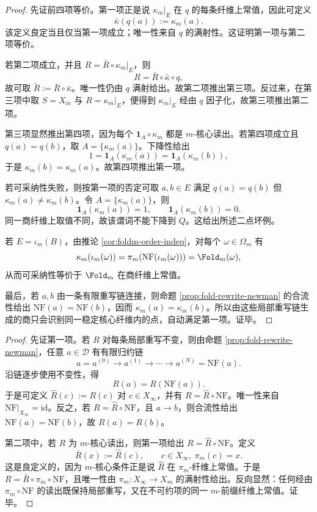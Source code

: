 \begin{proof}
先证前四项等价。第一项正是说 \(\kappa_m|_E\) 在 \(q\) 的每条纤维上常值，因此可定义
\[
\bar\kappa(q(a)):=\kappa_m(a).
\]
该定义良定当且仅当第一项成立；唯一性来自 \(q\) 的满射性。这证明第一项与第二项等价。

若第二项成立，并且 \(R=\bar R\circ\kappa_m|_E\)，则
\[
R=\bar R\circ\bar\kappa\circ q,
\]
故可取 \(\widetilde R:=\bar R\circ\bar\kappa\)。唯一性仍由 \(q\) 满射给出。故第二项推出第三项。反过来，在第三项中取 \(S=X_m\) 与 \(R=\kappa_m|_E\)，便得到 \(\kappa_m|_E\) 经由 \(q\) 因子化，故第三项推出第二项。

第三项显然推出第四项，因为每个 \(\mathbf 1_A\circ\kappa_m\) 都是 \(m\)-核心读出。若第四项成立且 \(q(a)=q(b)\)，取
\(A=\{\kappa_m(a)\}\)。下降性给出
\[
1=\mathbf 1_A(\kappa_m(a))=\mathbf 1_A(\kappa_m(b)),
\]
于是 \(\kappa_m(b)=\kappa_m(a)\)。故第四项推出第一项。

若可采纳性失败，则按第一项的否定可取 \(a,b\in E\) 满足
\(q(a)=q(b)\) 但 \(\kappa_m(a)\ne\kappa_m(b)\)。令
\(A=\{\kappa_m(a)\}\)，则
\[
\mathbf 1_A(\kappa_m(a))=1,
\qquad
\mathbf 1_A(\kappa_m(b))=0.
\]
同一商纤维上取值不同，故该谓词不能下降到 \(Q\)。这给出所述二点坏例。

若 \(E=\iota_m(B)\)，由推论 \ref{cor:foldm-order-indep}，对每个 \(\omega\in\Omega_m\) 有
\[
\kappa_m(\iota_m(\omega))
=\pi_m(\mathrm{NF}(\iota_m(\omega)))
=\Fold_m(\omega),
\]
从而可采纳性等价于 \(\Fold_m\) 在商纤维上常值。

最后，若 \(a,b\) 由一条有限重写链连接，则命题 \ref{prop:fold-rewrite-newman} 的合流性给出
\(\mathrm{NF}(a)=\mathrm{NF}(b)\)，因而
\(\kappa_m(a)=\kappa_m(b)\)。所以由这些局部重写链生成的商只会识别同一稳定核心纤维内的点，自动满足第一项。证毕。
\end{proof}

\begin{proof}
先证第一项。若 \(R\) 对每条局部重写不变，则由命题 \ref{prop:fold-rewrite-newman}，任意 \(a\in\mathcal D\) 有有限归约链
\[
a=a^{(0)}\to a^{(1)}\to\cdots\to a^{(N)}=\mathrm{NF}(a).
\]
沿链逐步使用不变性，得
\[
R(a)=R(\mathrm{NF}(a)).
\]
于是可定义 \(\widehat R(c):=R(c)\) 对 \(c\in X_\infty\)，并有 \(R=\widehat R\circ\mathrm{NF}\)。唯一性来自 \(\mathrm{NF}|_{X_\infty}=\mathrm{id}\)。反之，若 \(R=\widehat R\circ\mathrm{NF}\)，且 \(a\to b\)，则合流性给出 \(\mathrm{NF}(a)=\mathrm{NF}(b)\)，故 \(R(a)=R(b)\)。

第二项中，若 \(R\) 为 \(m\)-核心读出，则第一项给出 \(R=\widehat R\circ\mathrm{NF}\)。定义
\[
\bar R(x):=\widehat R(c),\qquad c\in X_\infty,\ \pi_m(c)=x.
\]
这是良定义的，因为 \(m\)-核心条件正是说 \(\widehat R\) 在 \(\pi_m\)-纤维上常值。于是 \(R=\bar R\circ\pi_m\circ\mathrm{NF}\)，且唯一性由 \(\pi_m:X_\infty\to X_m\) 的满射性给出。反向显然：任何经由 \(\pi_m\circ\mathrm{NF}\) 的读出既保持局部重写，又在不可约项的同一 \(m\)-前缀纤维上常值。证毕。
\end{proof}

